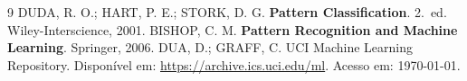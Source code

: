 \documentclass[12pt, a4paper]{article}
\begin{document}
\newpage
\begin{thebibliography}{9}
     DUDA, R. O.; HART, P. E.; STORK, D. G\@.
        \textbf{Pattern Classification}. 2.~ed. Wiley-Interscience, 2001.
     BISHOP, C. M\@.
        \textbf{Pattern Recognition and Machine Learning}. Springer, 2006.
     DUA, D.; GRAFF, C\@. UCI Machine Learning Repository.
        Disponível em: \url{https://archive.ics.uci.edu/ml}. Acesso em: \today.
\end{thebibliography}
\end{document}
